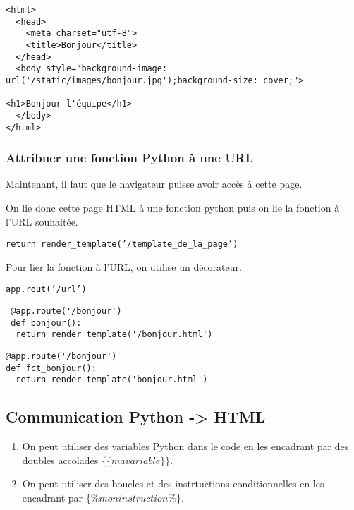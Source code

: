 \documentclass[12pt,a4paper]{article}
\begin{document}



\begin{verbatim}
<html>
  <head>
    <meta charset="utf-8">
    <title>Bonjour</title> 
  </head>
  <body style="background-image: url('/static/images/bonjour.jpg');background-size: cover;">
    
<h1>Bonjour l'équipe</h1>
  </body>
</html>
\end{verbatim}




\subsubsection{Attribuer une fonction Python à une URL}







Maintenant, il faut que le navigateur puisse avoir accès à cette page. 

\par 
\medskip
On lie donc cette page HTML à une fonction python puis on lie la fonction à l'URL souhaitée. \par 
\texttt{return render\_template('/template\_de\_la\_page')}

\par 
\medskip


Pour lier la fonction à l'URL, on utilise un décorateur. \par 
\texttt{app.rout('/url')}

\begin{verbatim}
 @app.route('/bonjour')
 def bonjour():
  return render_template('/bonjour.html')
\end{verbatim}

\begin{verbatim}
@app.route('/bonjour')
def fct_bonjour():
  return render_template('bonjour.html') 

\end{verbatim}


\subsection{Communication Python ->  HTML}
\begin{enumerate}
  \item On peut utiliser des variables Python dans le code en les encadrant par des doubles accolades $\{\{  ma variable  \}\}$.



  \item On peut utiliser des boucles et des instrtuctions conditionnelles en les encadrant par $\lbrace\%  mon instruction  \%\rbrace$.
\end{enumerate}
\end{document}
